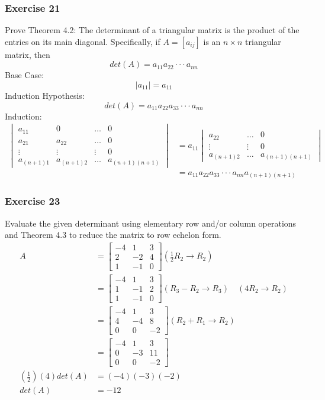 \documentclass{math}
\begin{document}
\subsubsection*{Exercise 21}
Prove Theorem 4.2: The determinant of a triangular matrix is the product of the
entries on its main diagonal. Specifically, if \( A = [a_{ij}] \) is an
\( n\times n \) triangular matrix, then
\[ det(A) = a_{11}a_{22}\cdot\cdot\cdot a_{nn} \]
Base Case:
\[ |a_{11}| = a_{11} \]
Induction Hypothesis:
\[ det(A) = a_{11}a_{22}a_{33}\cdot\cdot\cdot a_{nn} \]
Induction:
\begin{align*}
  \begin{vmatrix}
    a_{11} & 0 & \dots & 0 \\
    a_{21} & a_{22} & \dots & 0 \\
    \vdots & \vdots & \vdots & 0 \\
    a_{(n+1)1} & a_{(n+1)2} & \dots & a_{(n+1)(n+1)}
  \end{vmatrix} &= a_{11}\begin{vmatrix}
    a_{22} & \dots & 0 \\
    \vdots & \vdots & 0 \\
    a_{(n+1)2} & \dots & a_{(n+1)(n+1)}
  \end{vmatrix} \\
  &= a_{11}a_{22}a_{33}\cdot\cdot\cdot a_{nn}a_{(n+1)(n+1)}
\end{align*}

\subsubsection*{Exercise 23}
Evaluate the given determinant using elementary row and/or column operations and
Theorem 4.3 to reduce the matrix to row echelon form.
\begin{align*}
  A &= \begin{bmatrix}
    -4 & 1 & 3 \\
    2 & -2 & 4 \\
    1 & -1 & 0
  \end{bmatrix} (\frac{1}{2}R_2\to R_2) \\
  &= \begin{bmatrix}
    -4 & 1 & 3 \\
    1 & -1 & 2 \\
    1 & -1 & 0
  \end{bmatrix} (R_3-R_2\to R_3)\quad (4R_2\to R_2) \\
  &= \begin{bmatrix}
    -4 & 1 & 3 \\
    4 & -4 & 8 \\
    0 & 0 & -2
  \end{bmatrix} (R_2+R_1\to R_2) \\
  &= \begin{bmatrix}
    -4 & 1 & 3 \\
    0 & -3 & 11 \\
    0 & 0 & -2
  \end{bmatrix} \\
  \left(\frac{1}{2}\right)(4)det(A) &= (-4)(-3)(-2) \\
  det(A) &= -12
\end{align*}
\end{document}
